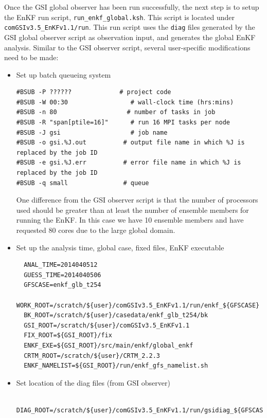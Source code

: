 Once the GSI global observer has been run successfully, the next step is to setup the EnKF run script, \verb|run_enkf_global.ksh|. This script is located under \verb|comGSIv3.5_EnKFv1.1/run|. This run script uses the \verb|diag| files generated by the GSI global observer script as observation input, and generates the global EnKF analysis. Similar to the GSI observer script, several user-specific modifications need to be made:
\begin{itemize}
\item Set up batch queueing system
\begin{footnotesize}
\begin{verbatim}
#BSUB -P ??????             # project code
#BSUB -W 00:30                 # wall-clock time (hrs:mins)
#BSUB -n 80                   # number of tasks in job         
#BSUB -R "span[ptile=16]"      # run 16 MPI tasks per node
#BSUB -J gsi                   # job name
#BSUB -o gsi.%J.out          # output file name in which %J is replaced by the job ID
#BSUB -e gsi.%J.err          # error file name in which %J is replaced by the job ID
#BSUB -q small               # queue
\end{verbatim}
\end{footnotesize}

One difference from the GSI observer script is that the number of processors used should be greater than at least the number of ensemble members for running the EnKF. In this case we have 10 ensemble members and have requested 80 cores due to the large global domain.\\

\item Set up the analysis time, global case, fixed files, EnKF executable
\begin{footnotesize}
\begin{verbatim}
  ANAL_TIME=2014040512
  GUESS_TIME=2014040506
  GFSCASE=enkf_glb_t254
  WORK_ROOT=/scratch/${user}/comGSIv3.5_EnKFv1.1/run/enkf_${GFSCASE} 
  BK_ROOT=/scratch/${user}/casedata/enkf_glb_t254/bk
  GSI_ROOT=/scratch/${user}/comGSIv3.5_EnKFv1.1
  FIX_ROOT=${GSI_ROOT}/fix
  ENKF_EXE=${GSI_ROOT}/src/main/enkf/global_enkf
  CRTM_ROOT=/scratch/${user}/CRTM_2.2.3
  ENKF_NAMELIST=${GSI_ROOT}/run/enkf_gfs_namelist.sh
\end{verbatim}
\end{footnotesize}

\item Set location of the diag files (from GSI observer)

\begin{footnotesize}
\begin{verbatim}
  DIAG_ROOT=/scratch/${user}/comGSIv3.5_EnKFv1.1/run/gsidiag_${GFSCASE}
\end{verbatim}
\end{footnotesize}


\end{itemize}
